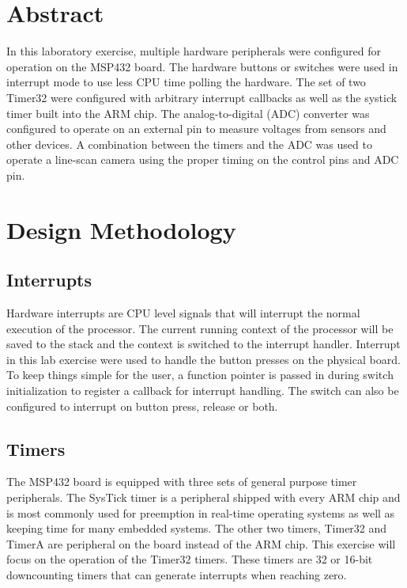 \documentclass[CMPE]{../KGCOEReport}
\begin{document}
    \maketitle
    \section*{Abstract}

    In this laboratory exercise, multiple hardware peripherals were configured for
    operation on the MSP432 board. The hardware buttons or switches were used in
    interrupt mode to use less CPU time polling the hardware.
    The set of two Timer32 were configured with arbitrary interrupt callbacks as
    well as the systick timer built into the ARM chip. The analog-to-digital (ADC)
    converter was configured to operate on an external pin to measure voltages from
    sensors and other devices. A combination between the timers and the ADC was used
    to operate a line-scan camera using the proper timing on the control pins and ADC pin.

    \section*{Design Methodology}

	\subsection*{Interrupts}

	Hardware interrupts are CPU level signals that will interrupt the normal execution
	of the processor. The current running context of the processor will be saved to
	the stack and the context is switched to the interrupt handler. Interrupt in this
	lab exercise were used to handle the button presses on the physical board. To keep
	things simple for the user, a function pointer is passed in during switch
	initialization to register a callback for interrupt handling. The switch can also
	be configured to interrupt on button press, release or both. 

	\subsection*{Timers}

	The MSP432 board is equipped with three sets of general purpose timer peripherals.
	The SysTick timer is a peripheral shipped with every ARM chip and is most commonly
	used for preemption in real-time operating systems as well as keeping time for
	many embedded systems. The other two timers, Timer32 and TimerA are peripheral on
	the board instead of the ARM chip. This exercise will focus on the operation of the
	Timer32 timers. These timers are 32 or 16-bit downcounting timers that can generate
	interrupts when reaching zero.\\
\end{document}
